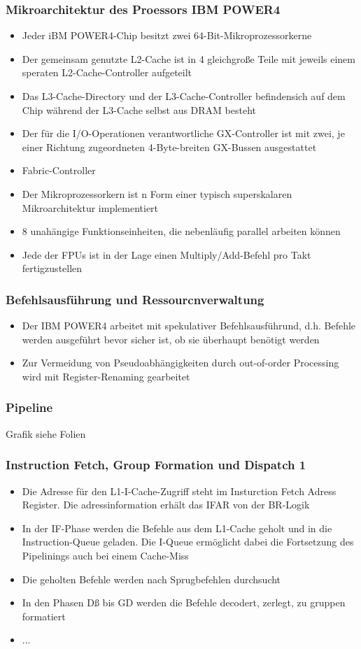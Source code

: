 \subsubsection{Mikroarchitektur des Proessors IBM POWER4}
\begin{itemize}
	\item Jeder iBM POWER4-Chip besitzt zwei 64-Bit-Mikroprozessorkerne
	\item Der gemeinsam genutzte L2-Cache ist in 4 gleichgroße Teile mit jeweils einem speraten L2-Cache-Controller aufgeteilt
	\item Das L3-Cache-Directory und der L3-Cache-Controller befindensich auf dem Chip während der L3-Cache selbst aus DRAM besteht
	\item Der für die I/O-Operationen verantwortliche GX-Controller ist mit zwei, je einer Richtung zugeordneten 4-Byte-breiten GX-Bussen ausgestattet
	\item Fabric-Controller
	\item Der Mikroprozessorkern ist n Form einer typisch superskalaren Mikroarchitektur implementiert
	\item 8 unahängige Funktionseinheiten, die nebenläufig parallel arbeiten können
	\item Jede der FPUs ist in der Lage einen Multiply/Add-Befehl pro Takt fertigzustellen
\end{itemize}
\subsubsection{Befehlsausführung und Ressourcnverwaltung}
\begin{itemize}
	\item Der IBM POWER4 arbeitet mit spekulativer Befehlsausführund, d.h. Befehle werden ausgeführt bevor sicher ist, ob sie überhaupt benötigt werden
	\item Zur Vermeidung von Pseudoabhängigkeiten durch out-of-order Processing wird mit Register-Renaming gearbeitet
\end{itemize}
\subsubsection{Pipeline}
Grafik siehe Folien
\subsubsection{Instruction Fetch, Group Formation und Dispatch 1}
\begin{itemize}
	\item Die Adresse für den L1-I-Cache-Zugriff steht im Insturction Fetch Adress Register. Die adressinformation erhält das IFAR von der BR-Logik
	\item In der IF-Phase werden die Befehle aus dem L1-Cache geholt und in die Instruction-Queue geladen. Die I-Queue ermöglicht dabei die Fortsetzung des Pipelinings auch bei einem Cache-Miss
	\item Die geholten Befehle werden nach Sprugbefehlen durchsucht
	\item In den Phasen Dß bis GD werden die Befehle decodert, zerlegt, zu gruppen formatiert
	\item ...
\end{itemize}
